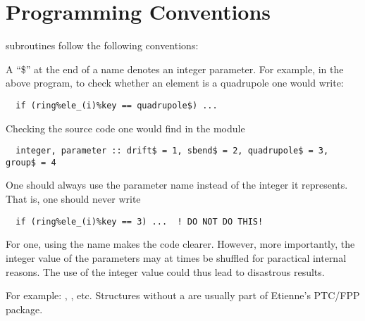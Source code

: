 \section{Programming Conventions}

\bmad subroutines follow the following conventions:

\begin{description}

\item[\$ Denotes Parameter:] A ``\$'' at the end of a name denotes an 
integer parameter. For example, in the above program, to check
whether an element is a quadrupole one would write:
\begin{verbatim}
  if (ring%ele_(i)%key == quadrupole$) ...
\end{verbatim}
Checking the source code one would find in the module 
\begin{verbatim}
  integer, parameter :: drift$ = 1, sbend$ = 2, quadrupole$ = 3, group$ = 4
\end{verbatim}
One should always use the parameter name instead of the integer it represents.
That is, one should never write
\begin{verbatim}
  if (ring%ele_(i)%key == 3) ...  ! DO NOT DO THIS!
\end{verbatim}
For one, using the name makes the code clearer. However, more
importantly, the integer value of the parameters may at times be
shuffled for paractical internal reasons. The use of the integer value
could thus lead to disastrous results.  

\item[Structure names have a \_struct suffix:]
For example: , , etc. Structures without a 
 are usually part of Etienne's PTC/FPP package.

\end{description}